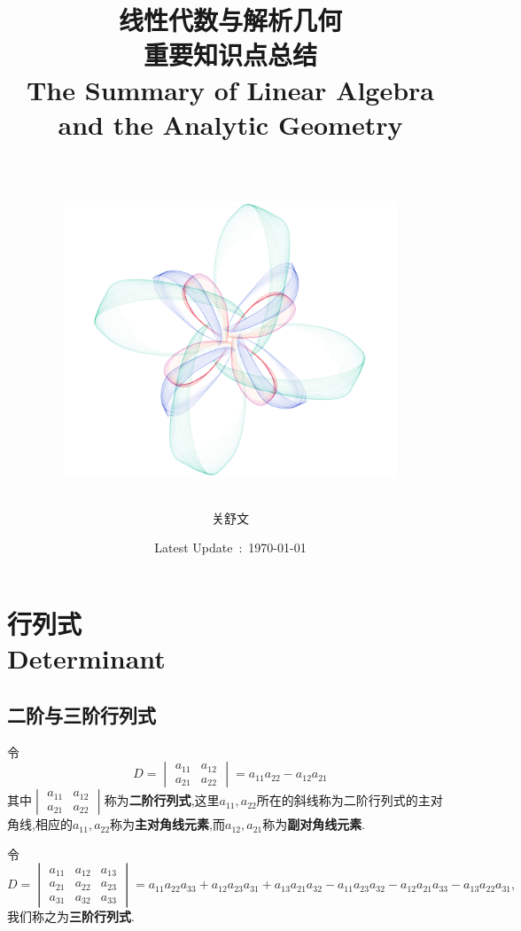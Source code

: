 \documentclass[9pt,a4paper]{book}
\title{线性代数与解析几何\\ \large{ 重要知识点总结}\\ \small{The Summary of Linear Algebra and the Analytic Geometry}\\
	\ \\
	\begin{center}
		\includegraphics[width=10cm]{cover6.png}

	\end{center}
}
\author{关舒文\\\small{\kaishu{华南理工大学}}}
\date{\small{Latest Update\ :\ \today}}
\begin{document}
\allowdisplaybreaks%
\maketitle
\thispagestyle{empty}
\restoregeometry
{\printnomenclature
\setcounter{page}{0}
}
\newpage
{}
\setcounter{page}{0}
\tableofcontents



\chapter{行列式\\Determinant}
\setcounter{page}{2}
\section{二阶与三阶行列式}
\begin{defination}[二阶行列式的定义]
	令\[ D= \begin{vmatrix}
	a_{11}&a_{12}\\a_{21}&a_{22}
	\end{vmatrix}=a_{11}a_{22}-a_{12}a_{21} \]其中$ \begin{vmatrix}
		a_{11}&a_{12}\\a_{21}&a_{22}
	\end{vmatrix} $称为\textbf{二阶行列式},这里$ a_{11},a_{22} $所在的斜线称为二阶行列式的主对角线,相应的$ a_{11},a_{22} $称为\textbf{主对角线元素},而$ a_{12},a_{21} $称为\textbf{副对角线元素}.
\end{defination}
\begin{defination}[三阶行列式的定义]
	令\[D={\begin{vmatrix}
		{{a_{11}}}&{{a_{12}}}&{{a_{13}}} \\ 
		{{a_{21}}}&{{a_{22}}}&{{a_{23}}} \\ 
		{{a_{31}}}&{{a_{32}}}&{{a_{33}}} 
		\end{vmatrix}} = {a_{11}}{a_{22}}{a_{33}} + {a_{12}}{a_{23}}{a_{31}} + {a_{13}}{a_{21}}{a_{32}} - {a_{11}}{a_{23}}{a_{32}} - {a_{12}}{a_{21}}{a_{33}} - {a_{13}}{a_{22}}{a_{31}},\]我们称之为\textbf{三阶行列式}.
\end{defination}
\end{document}

